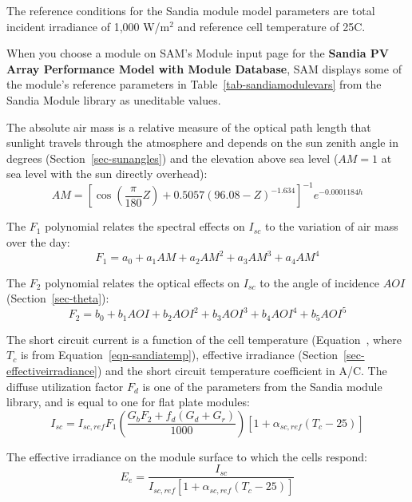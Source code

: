 \documentclass[12pt,letterpaper]{article}
\newcommand\AOI{\ensuremath{\mathit{AOI}}}
\begin{document}
The reference conditions for the Sandia module model parameters are total incident irradiance of 1,000 W/m$^2$ and reference cell temperature of 25\degree C. 

When you choose a module on SAM's Module input page for the \textbf{Sandia PV Array Performance Model with Module Database}, SAM displays some of the module's reference parameters in Table~\ref{tab-sandiamodulevars} from the Sandia Module library as uneditable values.

The absolute air mass is a relative measure of the optical path length that sunlight travels through the atmosphere and depends on the sun zenith angle in degrees (Section~\ref{sec-sunangles}) and the elevation above sea level ($AM=1$ at sea level with the sun directly overhead):
\begin{equation}\label{eqn-sandiaam}
AM = \left[ \cos(\frac{\pi}{180} Z ) + 0.5057 (96.08 - Z)^{-1.634} \right]^{-1} e^{-0.0001184 h}
\end{equation}

The $F_1$ polynomial relates the spectral effects on $I_{sc}$ to the variation of air mass over the day:
\begin{equation}
F_1 = a_0 + a_1 AM + a_2 AM^2 + a_3 AM^3 + a_4 AM^4
\end{equation}

The $F_2$ polynomial relates the optical effects on $I_{sc}$ to the angle of incidence $\AOI$ (Section~\ref{sec-theta}):
\begin{equation}
F_2 = b_0 + b_1\AOI
		+ b_2\AOI^2
		+ b_3\AOI^3
		+ b_4\AOI^4
		+ b_5\AOI^5
\end{equation}

The short circuit current is a function of the cell temperature (Equation~, where $T_c$ is from Equation~\ref{eqn-sandiatemp}), effective irradiance (Section~\ref{sec-effectiveirradiance}) and the short circuit temperature coefficient in A/\degree C. The diffuse utilization factor $F_d$ is one of the parameters from the Sandia module library, and is equal to one for flat plate modules:
\begin{equation}
I_{sc} = I_{sc,ref} F_1 \left( \frac{G_b F_2 + f_d (G_d+G_r)}{1000} \right) \left[1+\alpha_{sc,ref} (T_c-25)\right]
\end{equation}

The effective irradiance on the module surface to which the cells respond:
\begin{equation}
E_e = \frac{I_{sc}}{I_{sc,ref} \left[1 + \alpha_{sc,ref} (T_c - 25)\right]}
\end{equation}
\end{document}

